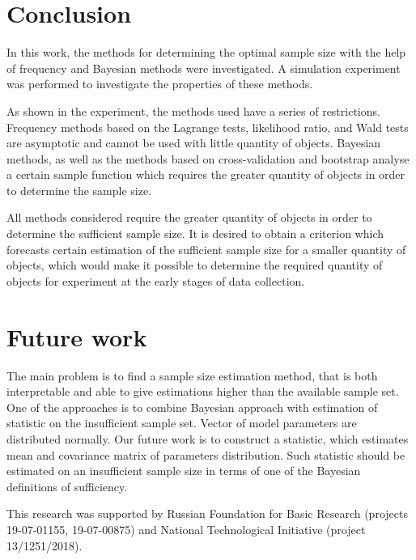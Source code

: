 \documentclass[
11pt,%
tightenlines,%
twoside,%
onecolumn,%
nofloats,%
nobibnotes,%
nofootinbib,%
superscriptaddress,%
noshowpacs,%
centertags]%
{revtex4}
\begin{document}
\section{Conclusion}
In this work, the methods for determining the optimal sample size with the help of frequency and Bayesian methods were investigated. A simulation experiment was performed to investigate the properties of these methods.

As shown in the experiment, the methods used have a series of restrictions. Frequency methods based on the Lagrange tests, likelihood ratio, and Wald tests are asymptotic and cannot be used with little quantity of objects. Bayesian methods, as well as the methods based on cross-validation and bootstrap analyse a certain sample function which requires the greater quantity of objects in order to determine the sample size.

All methods considered require the greater quantity of objects in order to determine the sufficient sample size. It is desired to obtain a criterion which forecasts certain estimation of the sufficient sample size for a smaller quantity of objects, which would make it possible to determine the required quantity of objects for experiment at the early stages of data collection.

\section{Future work}
The main problem is to find a sample size estimation method, that is both interpretable and able to give estimations higher than the available sample set. One of the approaches is to combine Bayesian approach with estimation of statistic on the insufficient sample set. Vector of model parameters are distributed normally. Our future work is to construct a statistic, which estimates mean and covariance matrix of parameters distribution. Such statistic should be estimated on an insufficient sample size in terms of one of the Bayesian definitions of sufficiency. 

\begin{acknowledgments}
This research was supported by Russian Foundation for Basic Research (projects 19-07-01155, 19-07-00875) and National Technological Initiative (project 13/1251/2018).
\end{acknowledgments}
\end{document}

